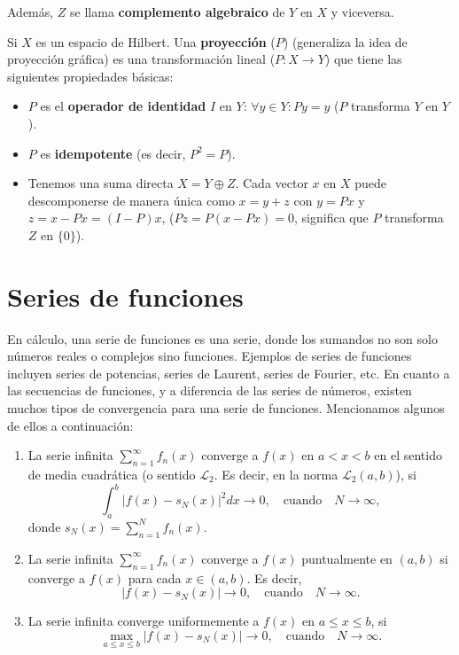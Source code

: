 \begin{multicols}{2}
Además, $Z$ se llama \textbf{complemento algebraico} de $Y$ en $X$ y viceversa. 

Si $X$ es un espacio de Hilbert. Una \textbf{proyección} ($P$) (generaliza la idea de proyección gráfica) es una transformación lineal ($P : X \rightarrow Y$) que tiene las siguientes propiedades básicas:
\begin{itemize}
    \item  $P$ es el \textbf{operador de identidad} $I$ en $Y$: $\forall y \in Y: Py = y$ ($P$ transforma $Y$ en $Y$).
    \item  $P$ es \textbf{idempotente} (es decir, $P^2 = P$).
    \item  Tenemos una suma directa $X = Y \oplus Z$. Cada vector $x$ en $X$ puede descomponerse de manera única como $x = y + z$ con $y = Px$ y $z = x - Px = (I - P)x$, ($Pz = P(x - Px) = 0$, significa que $P$ transforma $Z$ en $\{0\}$).
\end{itemize}


\section{Series de funciones}
En cálculo, una serie de funciones es una serie, donde los sumandos no son solo números reales o complejos sino funciones. Ejemplos de series de funciones incluyen series de potencias, series de Laurent, series de Fourier, etc. En cuanto a las secuencias de funciones, y a diferencia de las series de números, existen muchos tipos de convergencia para una serie de funciones. Mencionamos algunos de ellos a continuación:

\begin{enumerate}[\bfseries (i)]
    \item  La serie infinita $\sum_{n=1}^{\infty} f_n(x)$ converge a $f(x)$ en $a < x < b$ en el sentido de media cuadrática (o sentido $\mathcal{L}_2$. Es decir, en la norma $\mathcal{L}_2(a, b)$), si
    $$\int_a^b |f(x) - s_N(x)|^2 dx \rightarrow 0, \quad \text{cuando} \quad N \rightarrow \infty,$$
    donde $s_N(x) = \sum_{n=1}^{N} f_n(x)$.

    \item  La serie infinita $\sum_{n=1}^{\infty} f_n(x)$ converge a $f(x)$ puntualmente en $(a, b)$ si converge a $f(x)$ para cada $x \in (a, b)$. Es decir,
    $$|f(x) - s_N(x)| \rightarrow 0, \quad \text{cuando} \quad N \rightarrow \infty.$$

    \item  La serie infinita converge uniformemente a $f(x)$ en $a \leq x \leq b$, si
    $$\max_{a \leq x \leq b} |f(x) - s_N(x)| \rightarrow 0, \quad \text{cuando} \quad N \rightarrow \infty.$$


\end{enumerate}
\end{multicols}
